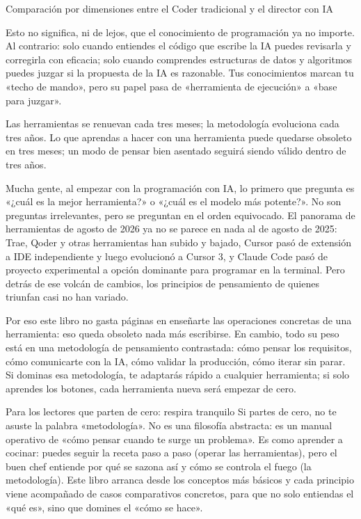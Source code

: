 \begin{center}\small\color{gray}Comparación por dimensiones entre el Coder tradicional y el director con IA\end{center}

Esto no significa, ni de lejos, que el conocimiento de programación ya no importe. Al contrario: solo cuando entiendes el código que escribe la IA puedes revisarla y corregirla con eficacia; solo cuando comprendes estructuras de datos y algoritmos puedes juzgar si la propuesta de la IA es razonable. Tus conocimientos marcan tu «techo de mando», pero su papel pasa de «herramienta de ejecución» a «base para juzgar».


Las herramientas se renuevan cada tres meses; la metodología evoluciona cada tres años. Lo que aprendas a hacer con una herramienta puede quedarse obsoleto en tres meses; un modo de pensar bien asentado seguirá siendo válido dentro de tres años.

Mucha gente, al empezar con la programación con IA, lo primero que pregunta es «¿cuál es la mejor herramienta?» o «¿cuál es el modelo más potente?». No son preguntas irrelevantes, pero se preguntan en el orden equivocado. El panorama de herramientas de agosto de 2026 ya no se parece en nada al de agosto de 2025: Trae, Qoder y otras herramientas han subido y bajado, Cursor pasó de extensión a IDE independiente y luego evolucionó a Cursor 3, y Claude Code pasó de proyecto experimental a opción dominante para programar en la terminal. Pero detrás de ese volcán de cambios, los principios de pensamiento de quienes triunfan casi no han variado.

Por eso este libro no gasta páginas en enseñarte las operaciones concretas de una herramienta: eso queda obsoleto nada más escribirse. En cambio, todo su peso está en una metodología de pensamiento contrastada: cómo pensar los requisitos, cómo comunicarte con la IA, cómo validar la producción, cómo iterar sin parar. Si dominas esa metodología, te adaptarás rápido a cualquier herramienta; si solo aprendes los botones, cada herramienta nueva será empezar de cero.

\begin{tcbinfo}{Para los lectores que parten de cero: respira tranquilo}
Si partes de cero, no te asuste la palabra «metodología». No es una filosofía abstracta: es un manual operativo de «cómo pensar cuando te surge un problema». Es como aprender a cocinar: puedes seguir la receta paso a paso (operar las herramientas), pero el buen chef entiende por qué se sazona así y cómo se controla el fuego (la metodología). Este libro arranca desde los conceptos más básicos y cada principio viene acompañado de casos comparativos concretos, para que no solo entiendas el «qué es», sino que domines el «cómo se hace».

\end{tcbinfo}

